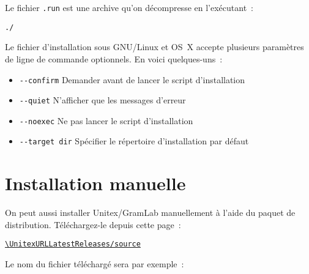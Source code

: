 \noindent Le fichier \verb+.run+ est une archive qu'on décompresse en l'exécutant~: 

\begin{flushleft}
{\tt ./\UnitexPackageLinux{}}
\end{flushleft}

\begin{samepage}
\noindent Le fichier d'installation sous GNU/Linux et OS~X accepte plusieurs paramètres de ligne de commande optionnels. En voici quelques-uns~:

\begin{itemize}
\itemsep1pt\parskip0pt
\item
  \texttt{-\/-confirm} \hspace{.15in} Demander avant de lancer le script d'installation \\
\item
  \texttt{-\/-quiet} \hspace{.15in} N'afficher que les messages d'erreur\\
\item
  \texttt{-\/-noexec} \hspace{.15in} Ne pas lancer le script d'installation \\
\item
  \texttt{-\/-target dir}  \hspace{.15in} Spécifier le répertoire d'installation par défaut
\end{itemize}
\end{samepage}

\section{Installation manuelle}
\begin{samepage}

On peut aussi installer Unitex/GramLab manuellement à l'aide du paquet de distribution. Téléchargez-le depuis cette page~:
\nopagebreak
\begin{center}
{\tt\url{\UnitexURLLatestReleases/source}}
\end{center}

\noindent Le nom du fichier téléchargé sera par exemple~:
\begin{flushleft}
{\tt \UnitexPackageSource{}}
\end{flushleft}

\end{samepage}

